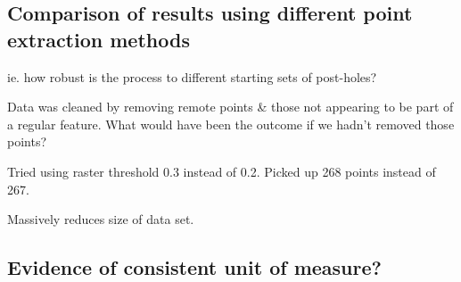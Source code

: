 \documentclass[../../ArchStats.tex]{subfiles}
\begin{document}
\subsection{Comparison of results using different point extraction methods}
ie. how robust is the process to different starting sets of post-holes?

Data was cleaned by removing remote points \& those not appearing to be part of a regular feature. What would have been the outcome if we hadn't removed those points?


Tried using raster threshold 0.3 instead of 0.2. Picked up 268 points instead of 267.

 Massively reduces size of data set.

\subsection{Evidence of consistent unit of measure?}
\end{document}
